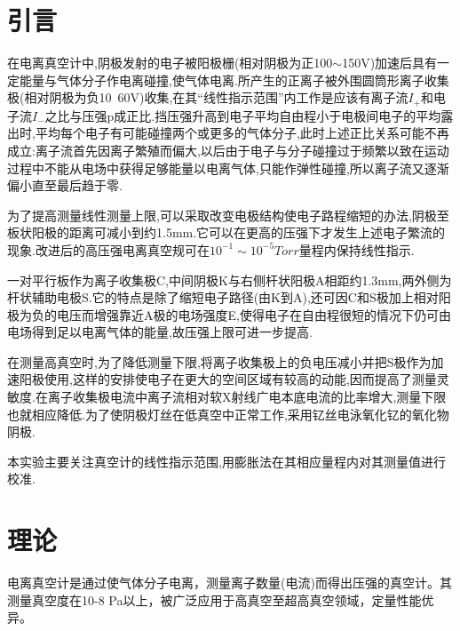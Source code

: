 \documentclass[a4paper]{article}
\begin{document}
\newpage
\begin{center}
\tableofcontents\label{c}
\end{center}
\newpage

\section{引言} \label{overview}%
在电离真空计中,阴极发射的电子被阳极栅(相对阴极为正100$\sim$150V)加速后具有一定能量与气体分子作电离碰撞,使气体电离.所产生的正离子被外围圆筒形离子收集极(相对阴极为负10~60V)收集,在其“线性指示范围”内工作是应该有离子流$I_+$和电子流$I_-$之比与压强p成正比.挡压强升高到电子平均自由程小于电极间电子的平均露出时,平均每个电子有可能碰撞两个或更多的气体分子,此时上述正比关系可能不再成立:离子流首先因离子繁殖而偏大,以后由于电子与分子碰撞过于频繁以致在运动过程中不能从电场中获得足够能量以电离气体,只能作弹性碰撞,所以离子流又逐渐偏小直至最后趋于零.

为了提高测量线性测量上限,可以采取改变电极结构使电子路程缩短的办法,阴极至板状阳极的距离可减小到约1.5mm.它可以在更高的压强下才发生上述电子繁流的现象.改进后的高压强电离真空规可在$10^{-1}\sim10^{-5}\si{Torr}$量程内保持线性指示.

一对平行板作为离子收集极C,中间阴极K与右侧杆状阳极A相距约1.3mm,两外侧为杆状辅助电极S.它的特点是除了缩短电子路径(由K到A),还可因C和S极加上相对阳极为负的电压而增强靠近A极的电场强度E,使得电子在自由程很短的情况下仍可由电场得到足以电离气体的能量,故压强上限可进一步提高.

在测量高真空时,为了降低测量下限,将离子收集极上的负电压减小并把S极作为加速阳极使用,这样的安排使电子在更大的空间区域有较高的动能,因而提高了测量灵敏度.在离子收集极电流中离子流相对软X射线广电本底电流的比率增大,测量下限也就相应降低.为了使阴极灯丝在低真空中正常工作,采用钇丝电泳氧化钇的氧化物阴极.

本实验主要关注真空计的线性指示范围,用膨胀法在其相应量程内对其测量值进行校准.

\newpage
\section{理论} \label{theory}%
电离真空计是通过使气体分子电离，测量离子数量(电流)而得出压强的真空计。其测量真空度在10-8 Pa以上，被广泛应用于高真空至超高真空领域，定量性能优异。
\end{document}
